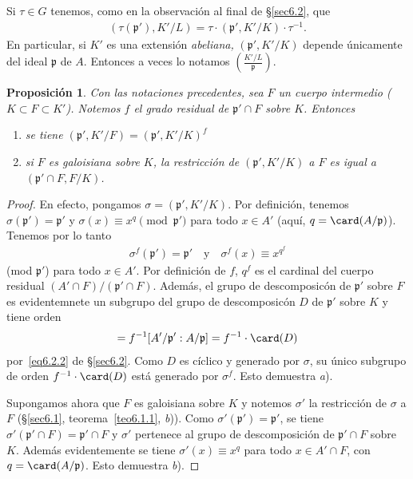 \documentclass[oneside,bibtotoc,leqno,spanish]{amsbook}
\newcommand{\idl}[1]{\mathfrak{#1}}
\numberwithin{equation}{section}
\theoremstyle{defi}
\theoremstyle{note}
\newtheorem{proposition}{Proposici\'on}
\theoremstyle{rem}
\numberwithin{theorem}{section}
\numberwithin{proposition}{section}
\numberwithin{definition}{section}
\numberwithin{lemma}{section}
\numberwithin{corollary}{section}
\numberwithin{example}{section}
\numberwithin{footnote}{section}%
\begin{document}
Si $\tau\in G$ tenemos, como en la observaci\'on al final de \S\ref{sec6.2}, que
\begin{gather}
(\tau(\idl{p}'),K'/L) = \tau\cdot(\idl{p}',K'/K)\cdot\tau^{-1}.
\end{gather}
En particular, si $K'$ es una extensi\'on {\em abeliana,} $(\idl{p'},K'/K)$ depende \'unicamente del
ideal $\idl{p}$ de $A$. Entonces a veces lo notamos $\left(\frac{K'/L}{\idl{p}}\right)$.

\begin{proposition}\label{prop6.3.1}
Con las notaciones precedentes, sea $F$ un cuerpo intermedio {\upshape(}$K\subset F\subset K'${\upshape).}
Notemos $f$ el grado residual de $\idl{p}'\cap F$ sobre $K$. Entonces
\begin{enumerate}
\item se tiene $(\idl{p}',K'/F) = (\idl{p}',K'/K)^{f}$
\item si $F$ es galoisiana sobre $K$, la restricci\'on de $(\idl{p}',K'/K)$ a $F$ es igual a
$(\idl{p}'\cap F,F/K)$.
\end{enumerate}
\end{proposition}

\begin{proof}
En efecto, pongamos $\sigma = (\idl{p}',K'/K)$. Por definici\'on, tenemos $\sigma(\idl{p}')=\idl{p}'$ y
$\sigma(x) \equiv x^{q}\pmod{\idl{p}'}$ para todo $x\in A'$ (aqu\'i, $q = \card(A/\idl{p})$). Tenemos por lo tanto
\begin{gather*}
\sigma^{f}(\idl{p}') = \idl{p}'\quad\text{y}\quad\sigma^{f}(x)\equiv x^{q^{f}}
\end{gather*}
(mod $\idl{p}'$) para todo $x\in A'$. Por definici\'on de $f$, $q^{f}$ es el cardinal del cuerpo residual
$(A'\cap F)/(\idl{p}'\cap F)$. Adem\'as, el grupo de descomposic\'on de $\idl{p}'$ sobre $F$
es evidentemnete un subgrupo del grupo de descomposic\'on $D$ de $\idl{p}'$ sobre $K$ y tiene orden
\begin{gather*}
[A'/\idl{p}':(A'\cap F)/(\idl{p}'\cap F)] = f^{-1}[A'/\idl{p}':A/\idl{p}] = f^{-1}\cdot\card(D)
\end{gather*}
por~\eqref{eq6.2.2} de \S\ref{sec6.2}. Como $D$ es c\'iclico y generado por $\sigma$, su \'unico subgrupo de orden $f^{-1}\cdot\card(D)$
est\'a generado por $\sigma^{f}$. Esto demuestra {\itshape a}).

Supongamos ahora que $F$ es galoisiana sobre $K$ y notemos $\sigma'$ la restricci\'on de $\sigma$ a $F$
(\S\ref{sec6.1}, teorema~\ref{teo6.1.1}, {\itshape b})). Como $\sigma'(\idl{p}') = \idl{p}'$, se tiene $\sigma'(\idl{p}'\cap F)=\idl{p}'\cap F$
y $\sigma'$ pertenece al grupo de descomposici\'on de $\idl{p}'\cap F$ sobre $K$. Adem\'as evidentemente
se tiene $\sigma'(x)\equiv x^{q}$ para todo $x\in A'\cap F$, con $q = \card(A/\idl{p})$. Esto demuestra {\itshape b}).
\end{proof}
\end{document}
